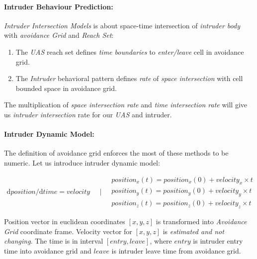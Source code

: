 \paragraph{Intruder Behaviour Prediction:} \emph{Intruder Intersection Models} is about space-time intersection of \emph{intruder body} with \emph{avoidance Grid} and \emph{Reach Set}:
\begin{enumerate}
    \item The \emph{UAS} reach set defines \emph{time boundaries} to \emph{enter/leave} cell in avoidance grid.
    \item The \emph{Intruder} behavioral pattern defines \emph{rate} of \emph{space intersection} with cell bounded space in avoidance grid.
\end{enumerate}

The multiplication of \emph{space intersection rate} and \emph{time intersection rate} will give us \emph{intruder intersection} rate for our \emph{UAS} and intruder.


\paragraph{Intruder Dynamic Model:} The  definition of avoidance grid enforces the  most of these methods to be numeric. Let us introduce intruder dynamic model:

\begin{equation}\label{eq:intruderBasicLinearModel}
    \begin{aligned}
        \text{d} position /\text{d} time = velocity 
    \end{aligned}
    \quad | \quad
    \begin{aligned}
        position_x(t) = position_x(0) + velocity_x \times t\\
        position_y(t) = position_y(0) + velocity_y \times t\\
        position_z(t) = position_z(0) + velocity_z \times t
    \end{aligned}
\end{equation}

\noindent Position vector in euclidean coordinates $[x,y,z]$   is transformed into \emph{Avoidance Grid} coordinate frame. Velocity vector for $[x,y,z]$  is \emph{estimated and not changing}. The time  is in interval $[entry,leave]$, where $entry$ is intruder entry time into avoidance grid and $leave$ is intruder leave time from avoidance grid. 

